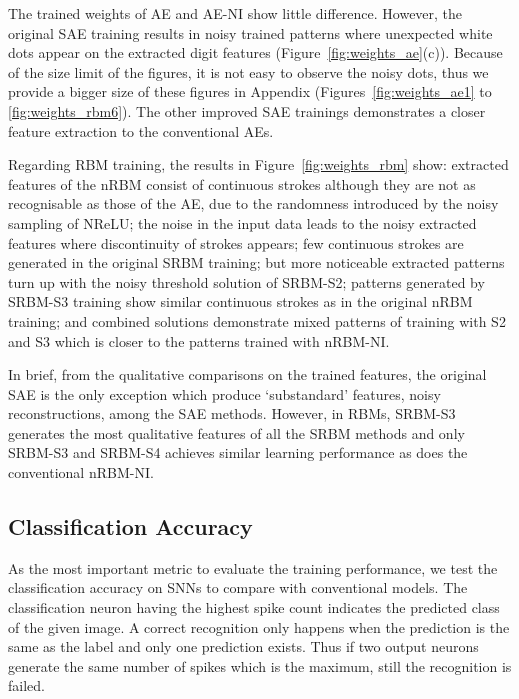 The trained weights of AE and AE-NI show little difference.
However, the original SAE training results in noisy trained patterns where unexpected white dots appear on the extracted digit features (Figure~\ref{fig:weights_ae}(c)).
Because of the size limit of the figures, it is not easy to observe the noisy dots, thus we provide a bigger size of these figures in Appendix (Figures~\ref{fig:weights_ae1} to \ref{fig:weights_rbm6}).
The other improved SAE trainings demonstrates a closer feature extraction to the conventional AEs.



Regarding RBM training,
the results in Figure~\ref{fig:weights_rbm} show:
extracted features of the nRBM consist of continuous strokes although they are not as recognisable as those of the AE, due to the randomness introduced by the noisy sampling of NReLU;
the noise in the input data leads to the noisy extracted features where discontinuity of strokes appears;
few continuous strokes are generated in the original SRBM training;
but more noticeable extracted patterns turn up with the noisy threshold solution of SRBM-S2;
patterns generated by SRBM-S3 training show similar continuous strokes as in the original nRBM training;
and combined solutions demonstrate mixed patterns of training with S2 and S3 which is closer to the patterns trained with nRBM-NI. 

In brief, from the qualitative comparisons on the trained features, the original SAE is the only exception which produce `substandard' features, noisy reconstructions, among the SAE methods.
However, in RBMs, SRBM-S3 generates the most qualitative features of all the SRBM methods and only SRBM-S3 and SRBM-S4 achieves similar learning performance as does the conventional nRBM-NI.
\subsection{Classification Accuracy}
\label{subsec:MNIST_ca}
As the most important metric to evaluate the training performance, we test the classification accuracy on SNNs to compare with conventional models.
The classification neuron having the highest spike count indicates the predicted class of the given image.
A correct recognition only happens when the prediction is the same as the label and only one prediction exists.
Thus if two output neurons generate the same number of spikes which is the maximum, still the recognition is failed.


